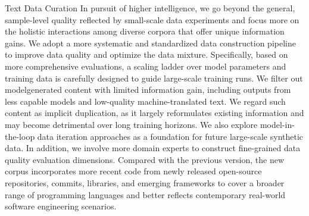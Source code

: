 \documentclass[
  10
]{article}
\begin{document}
Text Data Curation In pursuit of higher intelligence, we go beyond the
general, sample-level quality reflected by small-scale data experiments
and focus more on the holistic interactions among diverse corpora that
offer unique information gains. We adopt a more systematic and
standardized data construction pipeline to improve data quality and
optimize the data mixture. Specifically, based on more comprehensive
evaluations, a scaling ladder over model parameters and training data is
carefully designed to guide large-scale training runs. We filter out
modelgenerated content with limited information gain, including outputs
from less capable models and low-quality machine-translated text. We
regard such content as implicit duplication, as it largely reformulates
existing information and may become detrimental over long training
horizons. We also explore model-in-the-loop data iteration approaches as
a foundation for future large-scale synthetic data. In addition, we
involve more domain experts to construct fine-grained data quality
evaluation dimensions. Compared with the previous version, the new
corpus incorporates more recent code from newly released open-source
repositories, commits, libraries, and emerging frameworks to cover a
broader range of programming languages and better reflects contemporary
real-world software engineering scenarios.
\end{document}
